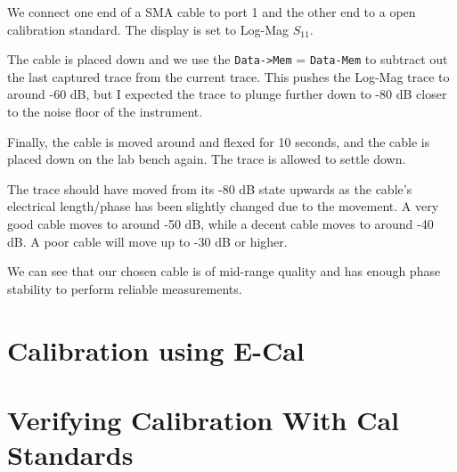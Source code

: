 \documentclass[11pt]{article}
\begin{document}
We connect one end of a SMA cable to port 1 and the other end to a open calibration standard. The display is set to Log-Mag $S_{11}$.

The cable is placed down and we use the \verb|Data->Mem| = \verb|Data-Mem| to subtract out the last captured trace from the current trace. This pushes the Log-Mag trace to around -60 dB, but I expected the trace to plunge further down to -80 dB closer to the noise floor of the instrument.

Finally, the cable is moved around and flexed for 10 seconds, and the cable is placed down on the lab bench again. The trace is allowed to settle down.

The trace should have moved from its -80 dB state upwards as the cable's electrical length/phase has been slightly changed due to the movement. A very good cable moves to around -50 dB, while a decent cable moves to around -40 dB. A poor cable will move up to -30 dB or higher.

We can see that our chosen cable is of mid-range quality and has enough phase stability to perform reliable measurements.

\section{Calibration using E-Cal}

\section{Verifying Calibration With Cal Standards}
\end{document}
